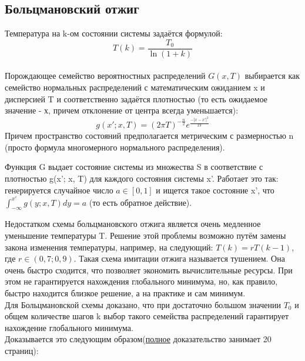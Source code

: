 \subsection{Больцмановский отжиг}
Температура на k-ом состоянии системы задаётся формулой: $$T(k) = \frac{T_0}{\ln(1+k)}$$ \\
Порождающее семейство вероятностных распределений $G(x,T)$ выбирается как семейство нормальных распределений с математическим ожиданием x и дисперсией T и соответственно задаётся плотностью (то есть ожидаемое значение - х, причем отклонение от центра всегда уменьшается): \\
$$\displaystyle g(x'; x, T) = (2\pi T)^{-\frac{n}{2}}e^{\frac{-|x-x'|^2}{2T}}$$
Причем пространство состояний предполагается метрическим с размерностью n (просто формула многомерного нормального распределения). \\
\begin{tcolorbox}[colback=gray!5!white, colframe=gray!75!black] Функция G выдает состояние системы из множества S в соответствие с плотностью g(x'; x, T) для каждого состояния системы x'. Работает это так: генерируется случайное число $a \in [0, 1]$ и ищется такое состояние x', что $\displaystyle \int_{-\infty}^{x'}g(y; x, T)dy=a$ (то есть обратное действие).
\end{tcolorbox}
Недостатком схемы больцмановского отжига является очень медленное уменьшение температуры T. Решение этой проблемы возможно путём замены закона изменения температуры, например, на следующий: $T(k) = rT(k-1)$, где $r \in (0,7; 0,9)$. Такая схема имитации отжига называется тушением. Она очень быстро сходится, что позволяет экономить вычислительные ресурсы. При этом не гарантируется нахождения глобального минимума, но, как правило, быстро находится близкое решение, а на практике и сам минимум. \\
Для Больцмановской схемы доказано, что при достаточно большом значении $T_0$ и общем количестве шагов k выбор такого семейства распределений гарантирует нахождение глобального минимума. \\
Доказывается это следующим образом(\href{https://web.mit.edu/6.435/www/Hajek88.pdf}{полное} доказательство занимает 20 страниц): \\

